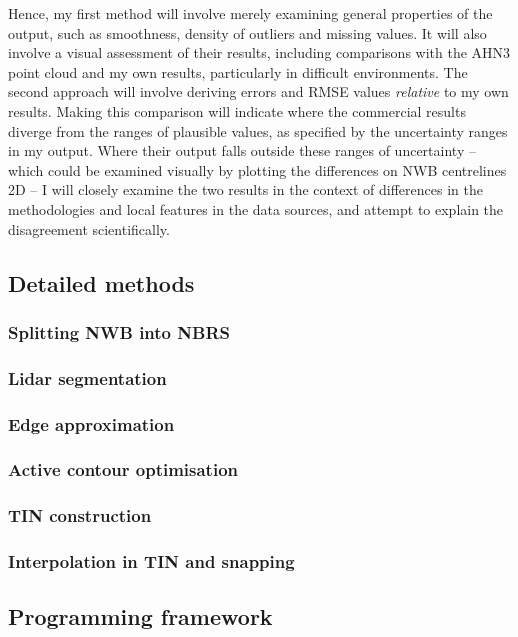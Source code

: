 Hence, my first method will involve merely examining general properties of the output, such as smoothness, density of outliers and missing values. It will also involve a visual assessment of their results, including comparisons with the AHN3 point cloud and my own results, particularly in difficult environments. The second approach will involve deriving errors and RMSE values \textit{relative} to my own results. Making this comparison will indicate where the commercial results diverge from the ranges of plausible values, as specified by the uncertainty ranges in my output. Where their output falls outside these ranges of uncertainty – which could be examined visually by plotting the differences on NWB centrelines 2D – I will closely examine the two results in the context of differences in the methodologies and local features in the data sources, and attempt to explain the disagreement scientifically.

\subsection{Detailed methods}
\label{sub:methodsdetailed}

\subsubsection*{Splitting NWB into NBRS}
\subsubsection*{Lidar segmentation}
\subsubsection*{Edge approximation}
\subsubsection*{Active contour optimisation}
\subsubsection*{TIN construction}
\subsubsection*{Interpolation in TIN and snapping}

\subsection{Programming framework}
\label{sub:methodsdetailed}